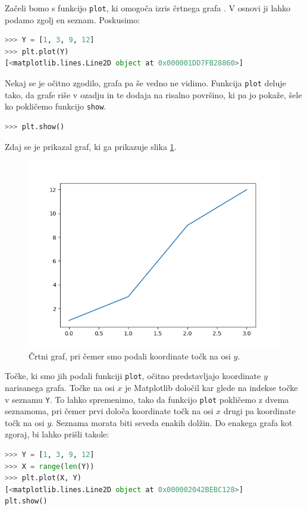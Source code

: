 Začeli bomo s funkcijo \texttt{plot}, ki omogoča izris črtnega grafa . V osnovi ji lahko podamo zgolj en seznam. Poskusimo:
\begin{lstlisting}[language=Python, showstringspaces=false]
>>> Y = [1, 3, 9, 12]
>>> plt.plot(Y)
[<matplotlib.lines.Line2D object at 0x000001DD7FB28860>]
\end{lstlisting}
Nekaj se je očitno zgodilo, grafa pa še vedno ne vidimo. Funkcija \texttt{plot} deluje tako, da grafe riše v ozadju in te dodaja na risalno površino, ki pa jo pokaže, šele ko pokličemo funkcijo \texttt{show}.
\begin{lstlisting}[language=Python, showstringspaces=false]
>>> plt.show()
\end{lstlisting}
Zdaj se je prikazal graf, ki ga prikazuje slika \ref{img:plt1}.
\begin{figure}
    \includegraphics[width=\linewidth]{img/plt1.png}
    \caption{Črtni graf, pri čemer smo podali koordinate točk na osi $y$.}
    \label{img:plt1}
\end{figure}
Točke, ki smo jih podali funkciji \texttt{plot}, očitno predstavljajo koordinate $y$ narisanega grafa. Točke na osi $x$ je Matplotlib določil kar glede na indekse točke v seznamu \texttt{Y}. To lahko spremenimo, tako da funkcijo \texttt{plot} pokličemo z dvema seznamoma, pri čemer prvi določa koordinate točk na osi $x$ drugi pa koordinate točk na osi $y$. Seznama morata biti seveda enakih dolžin. Do enakega grafa kot zgoraj, bi lahko prišli takole: 
\begin{lstlisting}[language=Python, showstringspaces=false]
>>> Y = [1, 3, 9, 12]
>>> X = range(len(Y))
>>> plt.plot(X, Y)
[<matplotlib.lines.Line2D object at 0x000002042BEBC128>]
plt.show()
\end{lstlisting}
